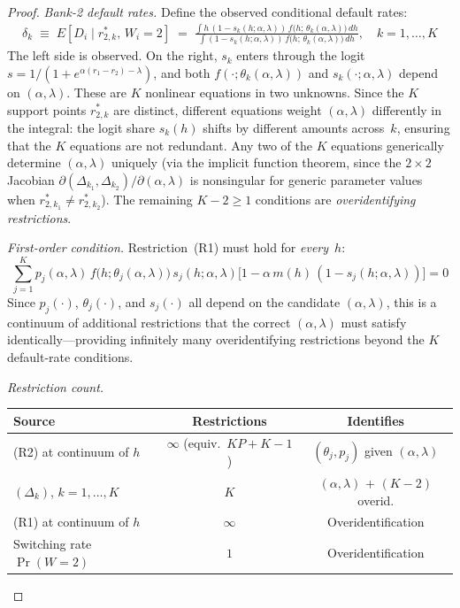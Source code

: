 \documentclass[12pt]{article}
\theoremstyle{plain}
\theoremstyle{plain}
\theoremstyle{definition}
\theoremstyle{remark}
\begin{document}
\begin{proof}
\emph{Bank-2 default rates.}  Define the observed conditional default rates:
\begin{align}\tag{$\Delta_k$}
    \delta_k \;\equiv\; E[D_i \mid r_{2,k}^*,\, W_i = 2] \;=\; \frac{\displaystyle\int h\,(1 - s_k(h;\alpha,\lambda))\, f\big(h;\,\theta_k(\alpha,\lambda)\big)\, dh}{\displaystyle\int (1 - s_k(h;\alpha,\lambda))\, f\big(h;\,\theta_k(\alpha,\lambda)\big)\, dh}, \quad k = 1,\ldots,K
\end{align}
The left side is observed.  On the right, $s_k$ enters through the logit $s = 1/(1 + e^{\alpha(r_1 - r_2) - \lambda})$, and both $f(\cdot;\theta_k(\alpha,\lambda))$ and $s_k(\cdot;\alpha,\lambda)$ depend on $(\alpha,\lambda)$.  These are $K$ nonlinear equations in two unknowns.  Since the $K$ support points $r_{2,k}^*$ are distinct, different equations weight $(\alpha,\lambda)$ differently in the integral: the logit share $s_k(h)$ shifts by different amounts across~$k$, ensuring that the $K$ equations are not redundant.  Any two of the $K$ equations generically determine $(\alpha,\lambda)$ uniquely (via the implicit function theorem, since the $2 \times 2$ Jacobian $\partial(\Delta_{k_1},\Delta_{k_2})/\partial(\alpha,\lambda)$ is nonsingular for generic parameter values when $r_{2,k_1}^* \neq r_{2,k_2}^*$).  The remaining $K - 2 \geq 1$ conditions are \emph{overidentifying restrictions}.

\emph{First-order condition.}  Restriction~(R1) must hold for \emph{every}~$h$:
\[
    \sum_{j=1}^K p_j(\alpha,\lambda)\, f\big(h;\theta_j(\alpha,\lambda)\big)\, s_j(h;\alpha,\lambda)\big[1 - \alpha\,m(h)\,(1-s_j(h;\alpha,\lambda))\big] = 0
\]
Since $p_j(\cdot)$, $\theta_j(\cdot)$, and $s_j(\cdot)$ all depend on the candidate $(\alpha,\lambda)$, this is a continuum of additional restrictions that the correct $(\alpha,\lambda)$ must satisfy identically---providing infinitely many overidentifying restrictions beyond the $K$ default-rate conditions.

\medskip\noindent
\emph{Restriction count.}
\begin{center}
\renewcommand{\arraystretch}{1.2}
\begin{tabular}{lcc}
\toprule
\textbf{Source} & \textbf{Restrictions} & \textbf{Identifies} \\
\midrule
(R2) at continuum of $h$ & $\infty$ (equiv.\ $KP + K - 1$) & $(\theta_j, p_j)$ given $(\alpha,\lambda)$ \\
$(\Delta_k)$, $k = 1,\ldots,K$ & $K$ & $(\alpha,\lambda)$ + $(K\!-\!2)$ overid. \\
(R1) at continuum of $h$ & $\infty$ & Overidentification \\
Switching rate $\Pr(W\!=\!2)$ & $1$ & Overidentification \\
\bottomrule
\end{tabular}
\end{center}



\end{proof}
\end{document}
